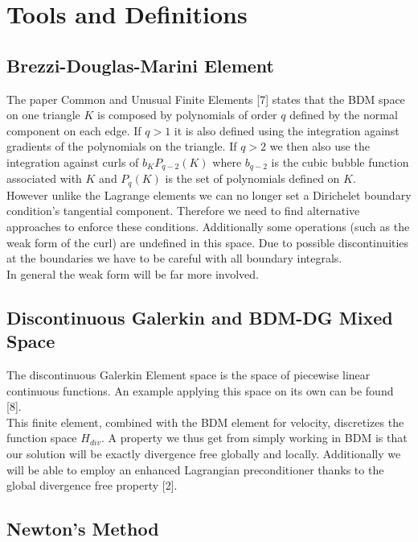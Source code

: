 \documentclass[11pt,twoside,a4paper]{article}
\begin{document}
\section{Tools and Definitions}
\subsection{Brezzi-Douglas-Marini Element}
The paper Common and Unusual Finite Elements [7] states that the BDM space on one triangle $K$ is composed by polynomials of order $q$ defined by the normal component on each edge. If $q > 1$ it is also defined using the integration against gradients of the polynomials on the triangle. If $q > 2$ we then also use the integration  against curls of $b_K P_{q-2}(K)$ where $b_{q-2}$ is the  cubic bubble function associated with $K$ and $P_{q}(K)$ is the set of polynomials defined on $K$.\\

However unlike the Lagrange elements we can no longer set a Dirichelet boundary condition's tangential component. Therefore we need to find alternative approaches to enforce these conditions.
Additionally some operations (such as the weak form of the curl) are undefined in this space. Due to possible discontinuities at the boundaries we have to be careful with all boundary integrals.\\

In general the weak form will be far more involved.


\subsection{Discontinuous Galerkin and BDM-DG Mixed Space}
The discontinuous Galerkin Element space is the space of piecewise linear continuous functions. An example applying this space on its own can be found [8].\\
This finite element, combined with the BDM element for velocity, discretizes the function space $H_{div}$. A property we thus get from simply working in BDM is that our solution will be exactly divergence free globally and locally.
Additionally we will be able to employ an enhanced Lagrangian preconditioner thanks to the global divergence free property [2].\\

\subsection{Newton's Method}
\end{document}
